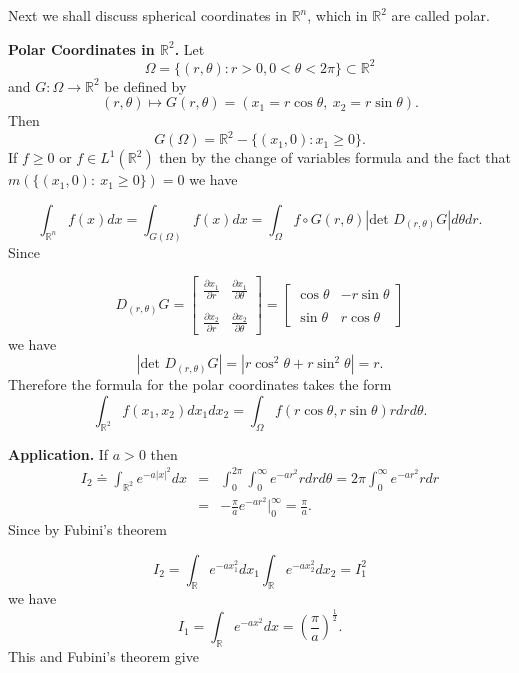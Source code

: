 \documentclass[12pt]{report}
\begin{document}
\vspace{.25cm}
\noindent
Next we shall discuss spherical coordinates in
$\mathbb{R}^n$, which in $\mathbb{R}^2$ are called
polar.

\vspace{.25cm}
\noindent
{\large\bf Polar Coordinates in $\mathbb{R}^2$.}  Let
\[
\Omega = \{(r, \theta): r > 0, 0 < \theta < 2 \pi\}
\subset \mathbb{R}^2
\]
and $G: \Omega \longrightarrow \mathbb{R}^2$ be
defined by
\[
(r, \theta) \longmapsto G(r, \theta) = (x_1 = r\cos
\theta, \ x_2 = r \sin \theta).
\]
Then
\[
G(\Omega) = \mathbb{R}^2 - \{(x_1, 0): x_1 \ge 0\}.
\]
If $f \ge 0 $ or $f \in L^1(\mathbb{R}^2)$ then by the
change of variables formula and the fact that
$m(\{(x_1, 0): \ x_1 \ge 0\}) = 0$ we have

\[
\int_{\mathbb{R}^n} f(x) dx = \int_{G(\Omega)} f(x)
dx = \int_\Omega f \circ G(r, \theta) |\mbox{det }
D_{(r, \theta)} G| d \theta d r.
\]
Since

\[
D_{(r, \theta)} G = \left [\begin{array}{ll}
\frac{\partial x_1}{\partial r} &\frac{\partial x_1}{\partial
\theta}\\
\\
\frac{\partial x_2}{\partial r}&\frac{\partial x_2}{\partial
\theta}\end{array}
 \right ] = \left [ \begin{array}{ll}
\cos \theta & - r \sin \theta\\
\\
\sin \theta &r \cos \theta\end{array}
\right ]
\]
we have
\[
|\mbox{det }D_{(r, \theta)} G| = |r \cos^2 \theta +
r\sin^2 \theta| = r.
\]
Therefore the formula for the polar coordinates takes
the form
\[
\int_{\mathbb{R}^2} f(x_1, x_2) dx_1 dx_2 =
\int_\Omega f(r \cos \theta, r \sin \theta) r dr
d\theta.
\]

\vspace{.25cm}
\noindent
{\bf Application.}  If $a > 0 $ then
\begin{eqnarray*}
I_2 \doteq \int_{\mathbb{R}^2} e^{-a|x|^2} dx &=&
\int_0^{2 \pi} \int^\infty_0 e^{-ar^2} rdr d\theta =
2\pi \int^\infty_0 e^{-ar^2} r dr\\
&=& - \frac{\pi}{a} e^{- ar^2} \big |^\infty_0 =
\frac{\pi}{a}.\end{eqnarray*}
Since by Fubini's theorem

\[
I_2 = \int_{\mathbb{R}} e^{-ax^2_1} dx_1
\int_{\mathbb{R}} e^{-ax^2_2} dx_2 = I^2_1
\]
we have
\[
I_1 = \int_{\mathbb{R}} e^{-ax^2} dx = \left (
\frac{\pi}{a} \right )^{\frac{1}{2}}.
\]
This and Fubini's theorem give
\end{document}
